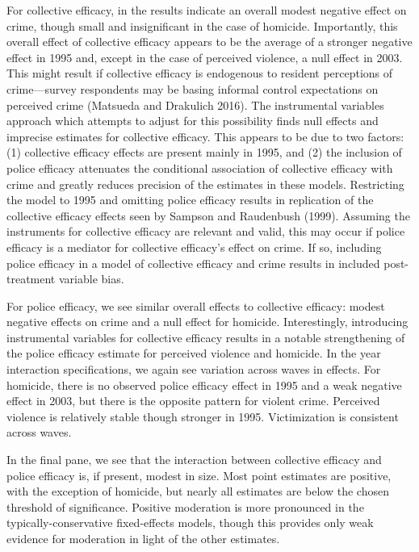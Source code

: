 \documentclass [11pt, proquest] {uwthesis}[2015/03/03]
\begin{document}
For collective efficacy, in the results indicate an overall modest negative effect on crime, though small and insignificant in the case of homicide. Importantly, this overall effect of collective efficacy appears to be the average of a stronger negative effect in 1995 and, except in the case of perceived violence, a null effect in 2003. This might result if collective efficacy is endogenous to resident perceptions of crime---survey respondents may be basing informal control expectations on perceived crime (Matsueda and Drakulich 2016). The instrumental variables approach which attempts to adjust for this possibility finds null effects and imprecise estimates for collective efficacy. This appears to be due to two factors: (1) collective efficacy effects are present mainly in 1995, and (2) the inclusion of police efficacy attenuates the conditional association of collective efficacy with crime and greatly reduces precision of the estimates in these models. Restricting the model to 1995 and omitting police efficacy results in replication of the collective efficacy effects seen by Sampson and Raudenbush (1999). Assuming the instruments for collective efficacy are relevant and valid, this may occur if police efficacy is a mediator for collective efficacy's effect on crime. If so, including police efficacy in a model of collective efficacy and crime results in included post-treatment variable bias.

For police efficacy, we see similar overall effects to collective efficacy: modest negative effects on crime and a null effect for homicide. Interestingly, introducing instrumental variables for collective efficacy results in a notable strengthening of the police efficacy estimate for perceived violence and homicide. In the year interaction specifications, we again see variation across waves in effects. For homicide, there is no observed police efficacy effect in 1995 and a weak negative effect in 2003, but there is the opposite pattern for violent crime. Perceived violence is relatively stable though stronger in 1995. Victimization is consistent across waves.

In the final pane, we see that the interaction between collective efficacy and police efficacy is, if present, modest in size. Most point estimates are positive, with the exception of homicide, but nearly all estimates are below the chosen threshold of significance. Positive moderation is more pronounced in the typically-conservative fixed-effects models, though this provides only weak evidence for moderation in light of the other estimates.
\end{document}
